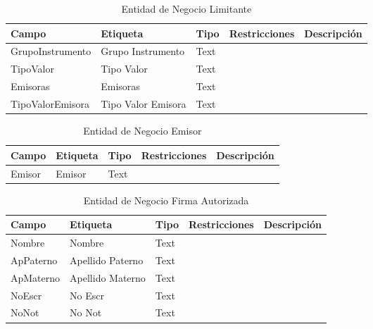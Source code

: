 \begin{table}[H]
	\caption{Entidad de Negocio Limitante}
	\label{tab:fields-dom-Limitante}
	\begin{center}
	\begin{tabularx}{0.90\linewidth}{ X X X X X }
		\hline
		\textbf{Campo} &
		\textbf{Etiqueta} &
		\textbf{Tipo} &
		\textbf{Restricciones} &
		\textbf{Descripci\'on} \\
		\hline
		GrupoInstrumento &
		Grupo Instrumento &
		Text &
		 &
		 \\
		TipoValor &
		Tipo Valor &
		Text &
		 &
		 \\
		Emisoras &
		Emisoras &
		Text &
		 &
		 \\
		TipoValorEmisora &
		Tipo Valor Emisora &
		Text &
		 &
		 \\
		\hline
	\end{tabularx}
	\end{center}
\end{table}
\begin{table}[H]
	\caption{Entidad de Negocio Emisor}
	\label{tab:fields-dom-Emisor}
	\begin{center}
	\begin{tabularx}{0.90\linewidth}{ X X X X X }
		\hline
		\textbf{Campo} &
		\textbf{Etiqueta} &
		\textbf{Tipo} &
		\textbf{Restricciones} &
		\textbf{Descripci\'on} \\
		\hline
		Emisor &
		Emisor &
		Text &
		 &
		 \\
		\hline
	\end{tabularx}
	\end{center}
\end{table}
\begin{table}[H]
	\caption{Entidad de Negocio Firma Autorizada}
	\label{tab:fields-dom-FirmaAutorizada}
	\begin{center}
	\begin{tabularx}{0.90\linewidth}{ X X X X X }
		\hline
		\textbf{Campo} &
		\textbf{Etiqueta} &
		\textbf{Tipo} &
		\textbf{Restricciones} &
		\textbf{Descripci\'on} \\
		\hline
		Nombre &
		Nombre &
		Text &
		 &
		 \\
		ApPaterno &
		Apellido Paterno &
		Text &
		 &
		 \\
		ApMaterno &
		Apellido Materno &
		Text &
		 &
		 \\
		NoEscr &
		No Escr &
		Text &
		 &
		 \\
		NoNot &
		No Not &
		Text &
		 &
		 \\
		\hline
	\end{tabularx}
	\end{center}
\end{table}
